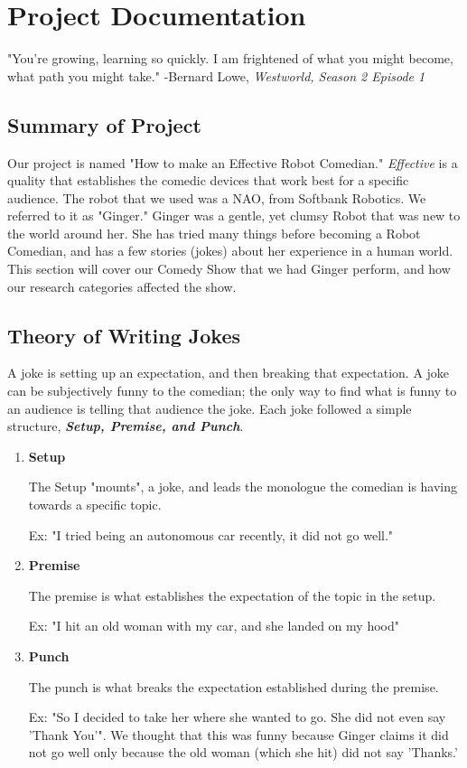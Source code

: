 
\section{Project Documentation}

	\begin{displayquote}
	"You're growing, learning so quickly. I am frightened of what you might become, what path you might take."
	-Bernard Lowe, \textit{Westworld, Season 2 Episode 1}
	\end{displayquote}

\subsection{Summary of Project}
Our project is named "How to make an Effective Robot Comedian."
\textit{Effective} is a quality that establishes the comedic devices that work best for a specific audience.
The robot that we used was a NAO, from Softbank Robotics. We referred to it as "Ginger."
Ginger was a gentle, yet clumsy Robot that was new to the world around her.
She has tried many things before becoming a Robot Comedian, and has a few stories (jokes) about her experience in a human world.
This section will cover our Comedy Show that we had Ginger perform, and how our research categories affected the show.


\subsection{Theory of Writing Jokes}
A joke is setting up an expectation, and then breaking that expectation.
A joke can be subjectively funny to the comedian; the only way to find what is funny to an audience is telling that audience the joke.
Each joke followed a simple structure, \textit{\textbf{Setup, Premise, and Punch}}.

    \begin{enumerate}
        \item{\textbf{Setup}}

            The Setup "mounts", a joke, and leads the monologue the comedian is having towards a specific topic.


            Ex: "I tried being an autonomous car recently, it did not go well."
        \item{\textbf{Premise}}

            The premise is what establishes the expectation of the topic in the setup.


            Ex: "I hit an old woman with my car, and she landed on my hood"
        \item{\textbf{Punch}}

            The punch is what breaks the expectation established during the premise.


            Ex: "So I decided to take her where she wanted to go. She did not even say 'Thank You'".
            We thought that this was funny because Ginger claims it did not go well only because the old woman (which she hit) did not say 'Thanks.'
    \end{enumerate}

